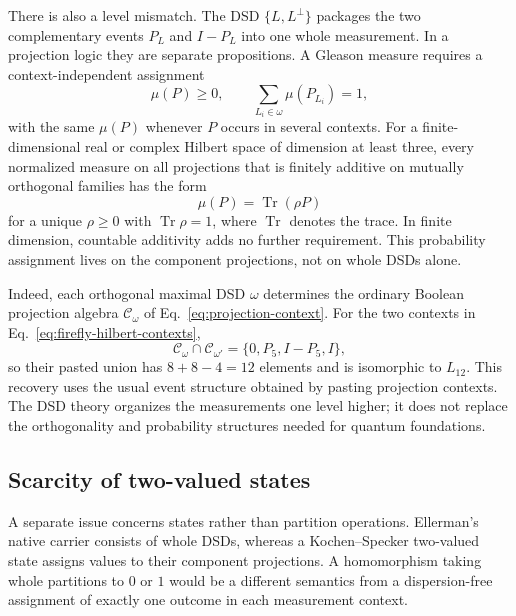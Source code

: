 \documentclass[aps,pra,reprint,nofootinbib]{revtex4-2}
\begin{document}
There is also a level mismatch.  The DSD $\{L,L^\perp\}$ packages the two
complementary events $P_L$ and $I-P_L$ into one whole measurement.  In a
projection logic they are separate propositions.  A Gleason measure requires
a context-independent assignment
\begin{equation}
  \mu(P)\geq0,
  \qquad
  \sum_{L_i\in\omega}\mu(P_{L_i})=1,
  \label{eq:gleason-measure}
\end{equation}
with the same $\mu(P)$ whenever $P$ occurs in several contexts.  For a
finite-dimensional real or complex Hilbert space of dimension at least three,
every normalized measure on all projections that is finitely additive on
mutually orthogonal families has the form
\begin{equation}
  \mu(P)=\operatorname{Tr}(\rho P)
\end{equation}
for a unique $\rho\geq0$ with $\operatorname{Tr}\rho=1$, where
$\operatorname{Tr}$ denotes the trace.  In finite dimension, countable additivity adds no further
requirement.
This probability assignment lives on the
component projections, not on whole DSDs alone.

Indeed, each orthogonal maximal DSD $\omega$ determines the ordinary Boolean
projection algebra $\mathcal C_\omega$ of Eq.~\eqref{eq:projection-context}.
For the two contexts in Eq.~\eqref{eq:firefly-hilbert-contexts},
\begin{equation}
  \mathcal C_\omega\cap\mathcal C_{\omega'}
  =\{0,P_5,I-P_5,I\},
\end{equation}
so their pasted union has $8+8-4=12$ elements and is isomorphic to
$L_{12}$.  This recovery uses the usual event structure obtained by pasting
projection contexts.  The DSD theory organizes the measurements one level
higher; it does not replace the orthogonality and probability structures
needed for quantum foundations.

\subsection{Scarcity of two-valued states}

A separate issue concerns states rather than partition operations.
Ellerman's native carrier consists of whole DSDs, whereas a
Kochen--Specker two-valued state assigns values to their component
projections.  A homomorphism taking whole partitions to $0$ or $1$ would be a
different semantics from a dispersion-free assignment of exactly one outcome
in each measurement context.
\end{document}
